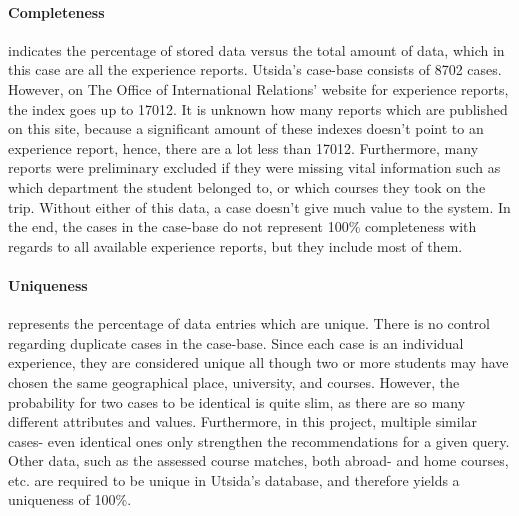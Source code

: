 \cleardoublepage





\iffalse
\paragraph{Completeness} indicates the percentage of stored data versus the total amount of data, which in this case are all the experience reports. Utsida's case-base consists of 8702 cases. However, on The Office of International Relations' website for experience reports, the index goes up to 17012. It is unknown how many reports which are published on this site, because a significant amount of these indexes doesn't point to an experience report, hence, there are a lot less than 17012. Furthermore, many reports were preliminary excluded if they were missing vital information such as which department the student belonged to, or which courses they took on the trip. Without either of this data, a case doesn't give much value to the system. In the end, the cases in the case-base do not represent 100\% completeness with regards to all available experience reports, but they include most of them.

\paragraph{Uniqueness} represents the percentage of data entries which are unique. There is no control regarding duplicate cases in the case-base. Since each case is an individual experience, they are considered unique all though two or more students may have chosen the same geographical place, university, and courses. However, the probability for two cases to be identical is quite slim, as there are so many different attributes and values. Furthermore, in this project, multiple similar cases- even identical ones only strengthen the recommendations for a given query. Other data, such as the assessed course matches, both abroad- and home courses, etc. are required to be unique in Utsida's database, and therefore yields a uniqueness of 100\%.

